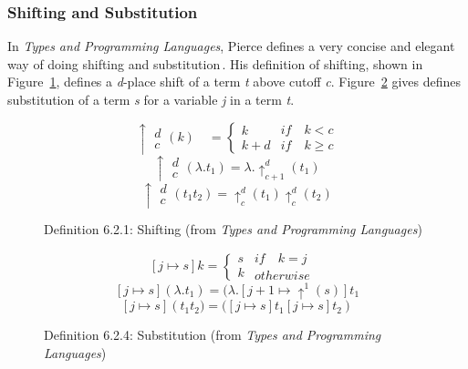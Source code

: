 \subsubsection{Shifting and Substitution}
In \textit{Types and Programming Languages}, Pierce defines a very concise and elegant way of doing shifting and substitution\,\cite[pp. 79-80]{Pierce:TypeSystems}. His definition of shifting, shown in Figure~\ref{fig:Pierce-shifting}, defines a \textit{d}-place shift of a term \textit{t} above cutoff \textit{c}. Figure~\ref{fig:Pierce-substitution} gives defines substitution of a term \textit{s} for a variable \textit{j} in a term \textit{t}.

\begin{figure}
\[\uparrow \begin{matrix} d \\ c \end{matrix}(k)\quad = \begin{cases} k \\ k+d \end{cases}\begin{matrix} if\quad k < c \\ if\quad k \ge c \end{matrix}\]
\[\uparrow \begin{matrix} d \\ c \end{matrix}(\lambda .{ t }_{ 1 }) = \lambda .{ \uparrow  }_{ c+1 }^{ d }({ t }_{ 1 })\]
\[\uparrow \begin{matrix} d \\ c \end{matrix}({ t }_{ 1 }{ t }_{ 2 }) = { \uparrow  }_{ c }^{ d }({ t }_{ 1 }) { \uparrow  }_{ c }^{ d }({ t }_{ 2 })\]
\caption{Definition 6.2.1: Shifting (from \textit{Types and Programming Languages})}
\label{fig:Pierce-shifting}
\end{figure}

\begin{figure}
\[[j\mapsto s]k=\begin{cases} s \\ k \end{cases}\begin{matrix} if\quad k=j\quad \\ otherwise \end{matrix}\]
\[[j\mapsto s](\lambda .{ t }_{ 1 })=(\lambda .[j+1\mapsto { \uparrow  }^{ 1 }(s)]{ t }_{ 1 }\]
\[[j\mapsto s]({ { t }_{ 1 }{ t }_{ 2 })=( }[j\mapsto s]{ t }_{ 1 }[j\mapsto s]{ t }_{ 2 })\]
\caption{Definition 6.2.4: Substitution (from \textit{Types and Programming Languages})}
\label{fig:Pierce-substitution}
\end{figure}


